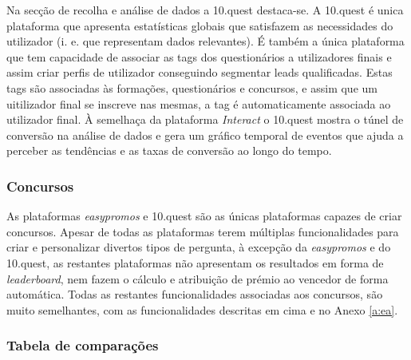 Na secção de recolha e análise de dados a 10.quest destaca-se. A 10.quest é unica plataforma que apresenta estatísticas globais que satisfazem as necessidades do utilizador (i. e. que representam dados relevantes). É também a única plataforma que tem capacidade de associar as tags dos questionários a utilizadores finais e assim criar perfis de utilizador conseguindo segmentar leads qualificadas. Estas tags são associadas às formações, questionários e concursos, e assim que um uitilizador final se inscreve nas mesmas, a tag é automaticamente associada ao utilizador final.  À semelhaça da plataforma \textit{Interact} o 10.quest mostra o túnel de conversão na análise de dados e gera um gráfico temporal de eventos que ajuda a perceber as tendências e as taxas de conversão ao longo do tempo.
 
 
 \subsubsection{Concursos}
 
 As plataformas \textit{easypromos} e 10.quest são as únicas plataformas capazes de criar concursos. 
 Apesar de todas as plataformas terem múltiplas funcionalidades para criar e personalizar divertos tipos de pergunta, à excepção da \textit{easypromos} e do 10.quest, as restantes plataformas não apresentam os resultados em forma de \textit{leaderboard}, nem fazem o cálculo e atribuição de prémio ao vencedor de forma automática.
 Todas as restantes funcionalidades associadas aos concursos, são muito semelhantes, com as funcionalidades descritas em cima e no Anexo \ref{a:ea}. 
 
 \subsubsection{Tabela de comparações}
	
